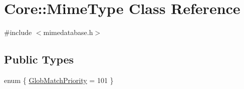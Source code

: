 \hypertarget{class_core_1_1_mime_type}{\section{\-Core\-:\-:\-Mime\-Type \-Class \-Reference}
\label{class_core_1_1_mime_type}
}


{\ttfamily \#include $<$mimedatabase.\-h$>$}

\subsection*{\-Public \-Types}
\begin{DoxyCompactItemize}
\item 
enum \{ \hyperlink{group___core_plugin_gga2d2c50f71e237a98c6c88d7dff43a802a3b3eb7b9aa0a00542cc996191befdcd6}{\-Glob\-Match\-Priority} =  101
 \}
\end{DoxyCompactItemize}

